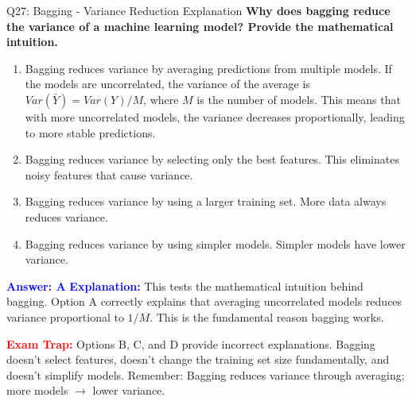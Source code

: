 \documentclass[8pt]{beamer}
\begin{document}
	\begin{frame}{Q27: Bagging - Variance Reduction Explanation}
		\fontsize{6.5}{7.5}\selectfont
		\textbf{Why does bagging reduce the variance of a machine learning model? Provide the mathematical intuition.}
		
		\begin{enumerate}
			\item Bagging reduces variance by averaging predictions from multiple models. If the models are uncorrelated, the variance of the average is $Var(\bar{Y}) = Var(Y)/M$, where $M$ is the number of models. This means that with more uncorrelated models, the variance decreases proportionally, leading to more stable predictions.
			\item Bagging reduces variance by selecting only the best features. This eliminates noisy features that cause variance.
			\item Bagging reduces variance by using a larger training set. More data always reduces variance.
			\item Bagging reduces variance by using simpler models. Simpler models have lower variance.
		\end{enumerate}
		
		\vspace{0.1cm}
		\textcolor{blue}{\textbf{Answer: A}}
		\vspace{0.1cm}
		\textcolor{blue}{\textbf{Explanation:}} This tests the mathematical intuition behind bagging. Option A correctly explains that averaging uncorrelated models reduces variance proportional to $1/M$. This is the fundamental reason bagging works.
		
		\textcolor{red}{\textbf{Exam Trap:}} Options B, C, and D provide incorrect explanations. Bagging doesn't select features, doesn't change the training set size fundamentally, and doesn't simplify models. Remember: Bagging reduces variance through averaging; more models $\rightarrow$ lower variance.
	\end{frame}
	
\end{document}
